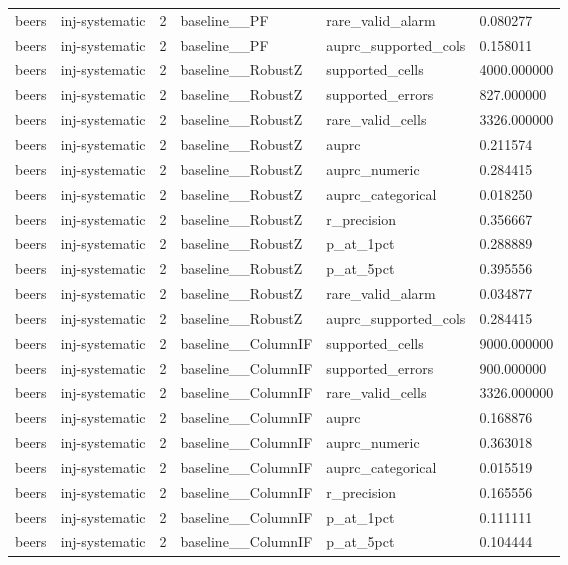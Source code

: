 \begin{tabular}{llllll}
beers & inj-systematic & 2 & baseline\_\_PF & rare\_valid\_alarm & 0.080277 \\
beers & inj-systematic & 2 & baseline\_\_PF & auprc\_supported\_cols & 0.158011 \\
beers & inj-systematic & 2 & baseline\_\_RobustZ & supported\_cells & 4000.000000 \\
beers & inj-systematic & 2 & baseline\_\_RobustZ & supported\_errors & 827.000000 \\
beers & inj-systematic & 2 & baseline\_\_RobustZ & rare\_valid\_cells & 3326.000000 \\
beers & inj-systematic & 2 & baseline\_\_RobustZ & auprc & 0.211574 \\
beers & inj-systematic & 2 & baseline\_\_RobustZ & auprc\_numeric & 0.284415 \\
beers & inj-systematic & 2 & baseline\_\_RobustZ & auprc\_categorical & 0.018250 \\
beers & inj-systematic & 2 & baseline\_\_RobustZ & r\_precision & 0.356667 \\
beers & inj-systematic & 2 & baseline\_\_RobustZ & p\_at\_1pct & 0.288889 \\
beers & inj-systematic & 2 & baseline\_\_RobustZ & p\_at\_5pct & 0.395556 \\
beers & inj-systematic & 2 & baseline\_\_RobustZ & rare\_valid\_alarm & 0.034877 \\
beers & inj-systematic & 2 & baseline\_\_RobustZ & auprc\_supported\_cols & 0.284415 \\
beers & inj-systematic & 2 & baseline\_\_ColumnIF & supported\_cells & 9000.000000 \\
beers & inj-systematic & 2 & baseline\_\_ColumnIF & supported\_errors & 900.000000 \\
beers & inj-systematic & 2 & baseline\_\_ColumnIF & rare\_valid\_cells & 3326.000000 \\
beers & inj-systematic & 2 & baseline\_\_ColumnIF & auprc & 0.168876 \\
beers & inj-systematic & 2 & baseline\_\_ColumnIF & auprc\_numeric & 0.363018 \\
beers & inj-systematic & 2 & baseline\_\_ColumnIF & auprc\_categorical & 0.015519 \\
beers & inj-systematic & 2 & baseline\_\_ColumnIF & r\_precision & 0.165556 \\
beers & inj-systematic & 2 & baseline\_\_ColumnIF & p\_at\_1pct & 0.111111 \\
beers & inj-systematic & 2 & baseline\_\_ColumnIF & p\_at\_5pct & 0.104444 \\

\end{tabular}
